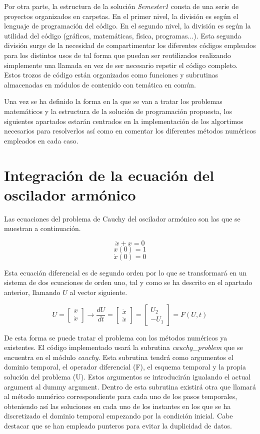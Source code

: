 \documentclass{article}
\begin{document}
	Por otra parte, la estructura de la solución \textit{Semester1} consta de una serie de proyectos organizados en carpetas. En el primer nivel, la división es según el lenguaje de programación del código. En el segundo nivel, la división es según la utilidad del código (gráficos, matemáticas, física, programas...). Esta segunda división surge de la necesidad de compartimentar los diferentes códigos empleados para los distintos usos de tal forma que puedan ser reutilizados realizando simplemente una llamada en vez de ser necesario repetir el código completo. Estos trozos de código están organizados como funciones y subrutinas almacenadas en módulos de contenido con temática en común.
	
	Una vez se ha definido la forma en la que se van a tratar los problemas matemáticos y la estructura de la solución de programación propuesta, los siguientes apartados estarán centrados en la implementación de los algortimos necesarios para resolverlos así como en comentar los diferentes métodos numéricos empleados en cada caso.
	
	\section{Integración de la ecuación del oscilador armónico}
	
	Las ecuaciones del problema de Cauchy del oscilador armónico son las que se muestran a continuación.
	
	$$\ddot{x}+x=0$$
	$$x(0)=1$$
	$$\dot{x}(0)=0$$
	
	Esta ecuación diferencial es de segundo orden por lo que se transformará en un sistema de dos ecuaciones de orden uno, tal y como se ha descrito en el apartado anterior, llamando $U$ al vector siguiente.
	
	\[
	U=\left[\begin{array}{c}
	x\\
	\dot{x}
	\end{array}\right]\rightarrow\frac{dU}{dt}=\left[\begin{array}{c}
	\dot{x}\\
	\ddot{x}
	\end{array}\right]=\left[\begin{array}{c}
	U_{2}\\
	-U_{1}
	\end{array}\right]=F(U,t)
	\]
	
	De esta forma se puede tratar el problema con los métodos numéricos ya existentes. El código implementado usará la subrutina \textit{cauchy\_problem} que se encuentra en el módulo \textit{cauchy}. Esta subrutina tendrá como argumentos el dominio temporal, el operador diferencial (F), el esquema temporal y la propia solución del problema (U). Estos argumentos se introducirán igualando el actual argument al dummy argument. Dentro de esta subrutina existirá otra que llamará al método numérico correspondiente para cada uno de los pasos temporales, obteniendo así las soluciones en cada uno de los instantes en los que se ha discretizado el dominio temporal empezando por la condición inicial. Cabe destacar que se han empleado punteros para evitar la duplicidad de datos.
	
\end{document}
